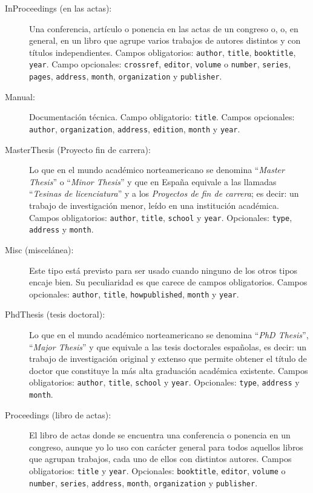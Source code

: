 \documentclass[a4paper,11pt]{article}
\begin{document}
\begin{description}
\item[InProceedings (en  las actas):] Una conferencia, artículo  o ponencia en
  las actas  de un congreso o,  o, en general,  en un libro que  agrupe varios
  trabajos  de  autores  distintos   y  con  títulos  independientes.   Campos
  obligatorios:     \texttt{author},    \texttt{title},    \texttt{booktitle},
  \texttt{year}.    Campo   opcionales:  \texttt{crossref},   \texttt{editor},
  \texttt{volume}   o    \texttt{number},   \texttt{series},   \texttt{pages},
  \texttt{address},        \texttt{month},       \texttt{organization}       y
  \texttt{publisher}.

\item[Manual:]  Documentación  técnica.   Campo  obligatorio:  \texttt{title}.
  Campos opcionales: \texttt{author}, \texttt{organization}, \texttt{address},
  \texttt{edition}, \texttt{month} y \texttt{year}.

\item[MasterThesis (Proyecto  fin de carrera):]  Lo que en el  mundo académico
  norteamericano   se  denomina   ``\emph{Master  Thesis}''   o  ``\emph{Minor
    Thesis}''  y que  en España  equivale  a las  llamadas ``\emph{Tesinas  de
    licenciatura}'' y a  los \emph{Proyectos de fin de  carrera}; es decir: un
  trabajo de investigación menor,  leído en una institución académica.  Campos
  obligatorios:    \texttt{author},    \texttt{title},    \texttt{school}    y
  \texttt{year}.      Opcionales:     \texttt{type},    \texttt{address}     y
  \texttt{month}.

\item[Misc  (miscelánea):]  Este tipo  está  previsto  para  ser usado  cuando
  ninguno de  los otros tipos  encaje bien. Su  peculiaridad es que  carece de
  campos  obligatorios.  Campos  opcionales:  \texttt{author}, \texttt{title},
  \texttt{howpublished}, \texttt{month} y \texttt{year}.

\item[PhdThesis (tesis doctoral):] Lo que en el mundo académico norteamericano
  se denomina ``\emph{PhD Thesis}'',  ``\emph{Major Thesis}'' y que equivale a
  las  tesis  doctorales españolas,  es  decir:  un  trabajo de  investigación
  original y extenso que permite obtener el título de doctor que constituye la
  más   alta    graduación   académica   existente.     Campos   obligatorios:
  \texttt{author},    \texttt{title},    \texttt{school}   y    \texttt{year}.
  Opcionales: \texttt{type}, \texttt{address} y \texttt{month}.

\item[Proceedings (libro de actas):] El  libro de actas donde se encuentra una
  conferencia o ponencia en un congreso, aunque yo lo uso con carácter general
  para  todos aquellos  libros que  agrupan trabajos,  cada uno  de  ellos con
  distintos  autores.  Campos  obligatorios:  \texttt{title} y  \texttt{year}.
  Opcionales:    \texttt{booktitle},   \texttt{editor},    \texttt{volume}   o
  \texttt{number},    \texttt{series},    \texttt{address},    \texttt{month},
  \texttt{organization} y \texttt{publisher}.


\end{description}
\end{document}
